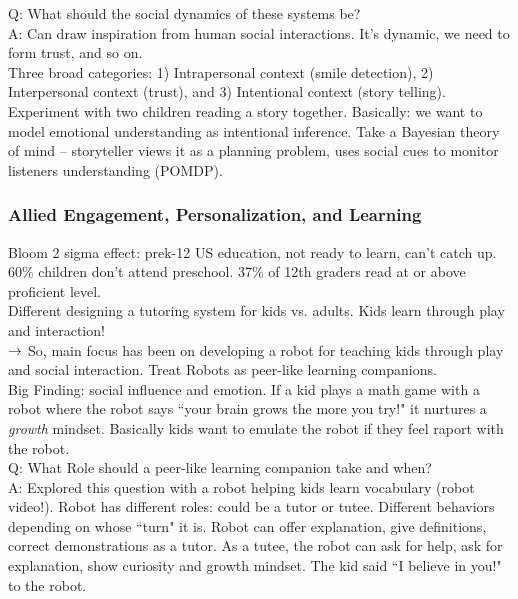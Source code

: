 Q: What should the social dynamics of these systems be? \\

A: Can draw inspiration from human social interactions. It's dynamic, we need to form trust, and so on. \\

Three broad categories: 1) Intrapersonal context (smile detection), 2) Interpersonal context (trust), and 3) Intentional context (story telling). \\

Experiment with two children reading a story together. Basically: we want to model emotional understanding as intentional inference. Take a Bayesian theory of mind -- storyteller views it as a planning problem, uses social cues to monitor listeners understanding (POMDP). \\

\subsubsection{Allied Engagement, Personalization, and Learning}

Bloom 2 sigma effect: prek-12 US education, not ready to learn, can't catch up. 60\% children don't attend preschool. 37\% of 12th graders read at or above proficient level. \\

Different designing a tutoring system for kids vs. adults. Kids learn through play and interaction! \\

$\rightarrow$ So, main focus has been on developing a robot for teaching kids through play and social interaction. Treat Robots as peer-like learning companions. \\

Big Finding: social influence and emotion. If a kid plays a math game with a robot where the robot says ``your brain grows the more you try!" it nurtures a {\it growth} mindset. Basically kids want to emulate the robot if they feel raport with the robot. \\

Q: What Role should a peer-like learning companion take and when? \\

A: Explored this question with a robot helping kids learn vocabulary (robot video!). Robot has different roles: could be a tutor or tutee. Different behaviors depending on whose ``turn" it is. Robot can offer explanation, give definitions, correct demonstrations as a tutor. As a tutee, the robot can ask for help, ask for explanation, show curiosity and growth mindset. The kid said ``I believe in you!" to the robot.\\
 \\

